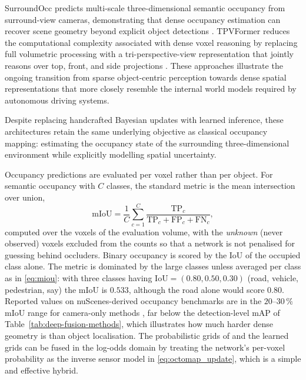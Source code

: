 SurroundOcc predicts multi-scale three-dimensional semantic occupancy from surround-view cameras, demonstrating that dense occupancy estimation can recover scene geometry beyond explicit object detections \cite{wei2023_surroundocc}. TPVFormer reduces the computational complexity associated with dense voxel reasoning by replacing full volumetric processing with a tri-perspective-view representation that jointly reasons over top, front, and side projections \cite{huang2023_tpvformer}. These approaches illustrate the ongoing transition from sparse object-centric perception towards dense spatial representations that more closely resemble the internal world models required by autonomous driving systems.

Despite replacing handcrafted Bayesian updates with learned inference, these architectures retain the same underlying objective as classical occupancy mapping: estimating the occupancy state of the surrounding three-dimensional environment while explicitly modelling spatial uncertainty.

Occupancy predictions are evaluated per voxel rather than per object. For semantic occupancy with $C$ classes, the standard metric is the mean intersection over union,
\begin{equation}
\mathrm{mIoU}=\frac{1}{C}\sum_{c=1}^{C}\frac{\mathrm{TP}_c}{\mathrm{TP}_c+\mathrm{FP}_c+\mathrm{FN}_c},
\label{eq:miou}
\end{equation}
computed over the voxels of the evaluation volume, with the \emph{unknown} (never observed) voxels excluded from the counts so that a network is not penalised for guessing behind occluders. Binary occupancy is scored by the IoU of the occupied class alone. The metric is dominated by the large classes unless averaged per class as in \eqref{eq:miou}: with three classes having $\mathrm{IoU}=(0.80,0.50,0.30)$ (road, vehicle, pedestrian, say) the mIoU is $0.533$, although the road alone would score $0.80$. Reported values on nuScenes-derived occupancy benchmarks are in the $20$--$30\,\%$ mIoU range for camera-only methods \cite{wei2023_surroundocc,huang2023_tpvformer}, far below the detection-level mAP of Table~\ref{tab:deep-fusion-methods}, which illustrates how much harder dense geometry is than object localisation. The probabilistic grids of  and the learned grids can be fused in the log-odds domain by treating the network's per-voxel probability as the inverse sensor model in \eqref{eq:octomap_update}, which is a simple and effective hybrid.

